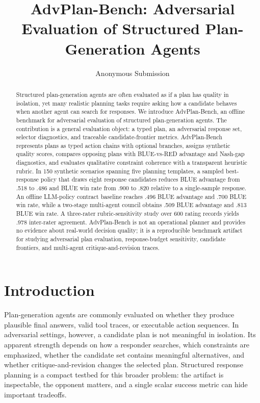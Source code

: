 \documentclass[letterpaper]{article} %
\title{AdvPlan-Bench: Adversarial Evaluation of Structured Plan-Generation Agents}
\author{Anonymous Submission}
\begin{document}
\maketitle

\begin{abstract}
Structured plan-generation agents are often evaluated as if a plan has quality in isolation, yet many realistic planning tasks require asking how a candidate behaves when another agent can search for responses. We introduce AdvPlan-Bench, an offline benchmark for adversarial evaluation of structured plan-generation agents. The contribution is a general evaluation object: a typed plan, an adversarial response set, selector diagnostics, and traceable candidate-frontier metrics. AdvPlan-Bench represents plans as typed action chains with optional branches, assigns synthetic quality scores, compares opposing plans with BLUE-vs-RED advantage and Nash-gap diagnostics, and evaluates qualitative constraint coherence with a transparent heuristic rubric. In 150 synthetic scenarios spanning five planning templates, a sampled best-response policy that draws eight response candidates reduces BLUE advantage from .518 to .486 and BLUE win rate from .900 to .820 relative to a single-sample response. An offline LLM-policy contract baseline reaches .496 BLUE advantage and .700 BLUE win rate, while a two-stage multi-agent council obtains .509 BLUE advantage and .813 BLUE win rate. A three-rater rubric-sensitivity study over 600 rating records yields .978 inter-rater agreement. AdvPlan-Bench is not an operational planner and provides no evidence about real-world decision quality; it is a reproducible benchmark artifact for studying adversarial plan evaluation, response-budget sensitivity, candidate frontiers, and multi-agent critique-and-revision traces.
\end{abstract}


\section{Introduction}

Plan-generation agents are commonly evaluated on whether they produce plausible final answers, valid tool traces, or executable action sequences. In adversarial settings, however, a candidate plan is not meaningful in isolation. Its apparent strength depends on how a responder searches, which constraints are emphasized, whether the candidate set contains meaningful alternatives, and whether critique-and-revision changes the selected plan. Structured response planning is a compact testbed for this broader problem: the artifact is inspectable, the opponent matters, and a single scalar success metric can hide important tradeoffs.
\end{document}
